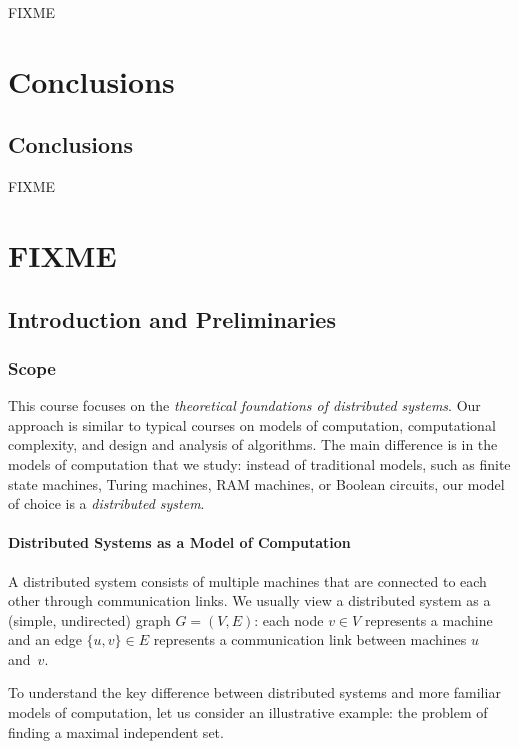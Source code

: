 FIXME

\part{Conclusions}

\chapter{Conclusions}

FIXME

\part{FIXME}

\chapter{Introduction and Preliminaries}

\section{Scope}

This course focuses on the \emph{theoretical foundations of distributed systems}. Our approach is similar to typical courses on models of computation, computational complexity, and design and analysis of algorithms. The main difference is in the models of computation that we study: instead of traditional models, such as finite state machines, Turing machines, RAM machines, or Boolean circuits, our model of choice is a \emph{distributed system}.

\subsection{Distributed Systems as a Model of Computation}\label{ssec:prelim-model}

A distributed system consists of multiple machines that are connected to each other through communication links. We usually view a distributed system as a (simple, undirected) graph $G = (V,E)$: each node $v \in V$ represents a machine and an edge $\{u,v\} \in E$ represents a communication link between machines $u$ and~$v$.

To understand the key difference between distributed systems and more familiar models of computation, let us consider an illustrative example: the problem of finding a maximal independent set.

